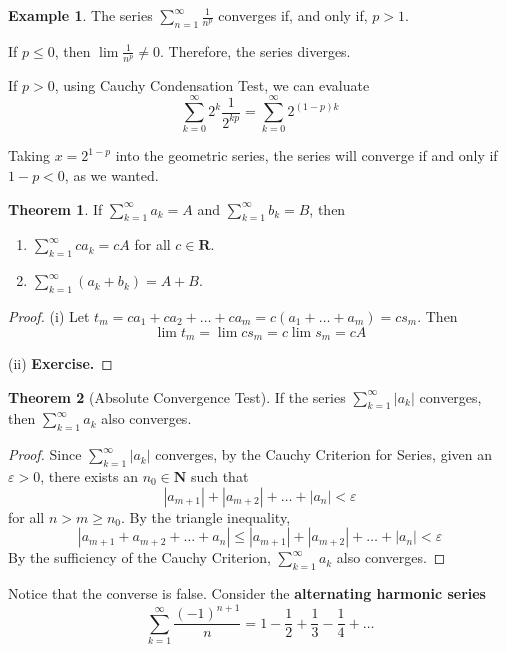 \documentclass[tikz,12pt,a4paper]{article}
\theoremstyle{definition}
\newtheorem{theorem}{Theorem}[section]
\newtheorem{example}{Example}[section]
\begin{document}
\begin{example}
	The series $\sum_{n=1}^\infty \frac{1}{n^p}$ converges if, and only if, $p > 1$.
	
	If $p \leq 0$, then $\lim \frac{1}{n^p} \neq 0$. Therefore, the series diverges.
	
	If $p > 0$, using Cauchy Condensation Test, we can evaluate
	\[
		\sum_{k=0}^\infty 2^k \frac{1}{2^{kp}} = \sum_{k=0}^\infty 2^{(1-p)k}
	\]
	
	Taking $x = 2^{1-p}$ into the geometric series, the series will converge if and only if $1-p < 0$, as we wanted.
\end{example}

\begin{theorem}
	If $\sum_{k=1}^\infty a_k = A$ and $\sum_{k=1}^\infty b_k = B$, then
	\begin{enumerate}
		\item[(i)] $\sum_{k=1}^\infty c a_k = c A$ for all $c \in \textbf{R}$.
		\item[(ii)] $\sum_{k=1}^\infty (a_k + b_k) = A + B$.
	\end{enumerate}
\end{theorem}

\begin{proof}
	(i) Let $t_m = c a_1 + c a_2 + \ldots + c a_m = c (a_1 + \ldots + a_m) = c s_m$. Then \[ \lim t_m = \lim c s_m = c \lim s_m = c A \]
	
	(ii) \textbf{Exercise.}
\end{proof}

\begin{theorem}[Absolute Convergence Test]
	If the series $\sum_{k=1}^\infty |a_k|$ converges, then $\sum_{k=1}^\infty a_k$ also converges.
\end{theorem}

\begin{proof}
	Since $\sum_{k=1}^\infty |a_k|$ converges, by the Cauchy Criterion for Series, given an $\varepsilon > 0$, there exists an $n_0 \in \textbf{N}$ such that
	\[
		|a_{m+1}| + |a_{m+2}| + \ldots + |a_n| < \varepsilon
	\]
	for all $n > m \geq n_0$. By the triangle inequality,
	\[
		|a_{m+1} + a_{m+2} + \ldots + a_n| \leq |a_{m+1}| + |a_{m+2}| + \ldots + |a_n| < \varepsilon
	\]
	By the sufficiency of the Cauchy Criterion, $\sum_{k=1}^\infty a_k$ also converges.
\end{proof}

Notice that the converse is false. Consider the \textbf{alternating harmonic series}
\[
	\sum_{k=1}^\infty \frac{(-1)^{n+1}}{n} = 1 - \frac{1}{2} + \frac{1}{3} - \frac{1}{4} + \ldots
\]
\end{document}
